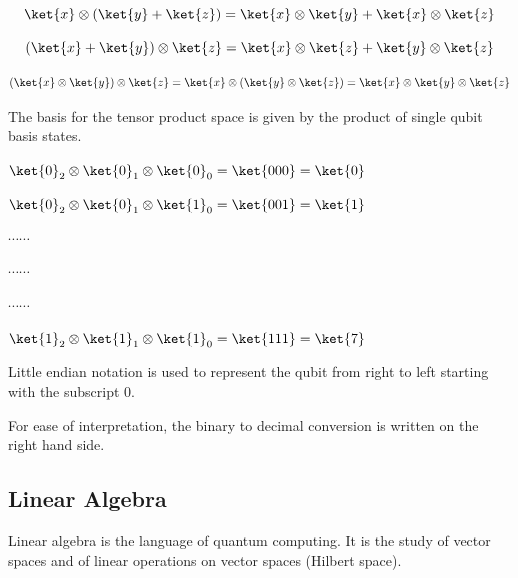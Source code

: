 \documentclass{article}
\begin{document}
\begin{equation}\ket{x} \otimes (\ket{y} + \ket{z}) = \ket{x}\otimes \ket{y} + \ket{x}\otimes\ket{z}
\end{equation}
\vspace{5mm}


\begin{equation}
(\ket{x} + \ket{y}) \otimes \ket{z} = \ket{x}\otimes \ket{z} + \ket{y}\otimes\ket{z}
\end{equation}
\vspace{5mm}


\begin{equation}
(\ket{x} \otimes \ket{y}) \otimes \ket{z} = \ket{x} \otimes (\ket{y} \otimes\ket{z}) = \ket{x} \otimes \ket{y} \otimes\ket{z}
\end{equation}
\vspace{10mm}

The basis for the tensor product space is given by the product of single qubit basis states.
\vspace{5mm}

\begin{center}
$\ket{0}_2 \otimes \ket{0}_1 \otimes \ket{0}_0 = \ket{000} = \ket{0}$
\vspace{5mm}

$\ket{0}_2 \otimes \ket{0}_1 \otimes \ket{1}_0 = \ket{001} = \ket{1}$
\vspace{5mm}

$\cdots \cdots $

$\cdots \cdots$

$\cdots \cdots$
\vspace{5mm}

$\ket{1}_2 \otimes \ket{1}_1 \otimes \ket{1}_0 = \ket{111} = \ket{7}$
\end{center}
\vspace{5mm}

Little endian notation is used to represent the qubit from right to left starting with the subscript 0.

For ease of interpretation, the binary to decimal conversion is written on the right hand side. 
\vspace{10mm}

\subsection{Linear Algebra}
\vspace{5mm}

\noindent
Linear algebra is the language of quantum computing. It is the study of vector spaces and of linear operations on vector
spaces (Hilbert space).
\vspace{5mm}
\end{document}
